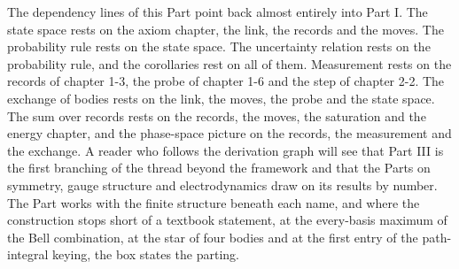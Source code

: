The dependency lines of this Part point back almost entirely into Part I. The state space rests on the axiom chapter, the link, the records and the moves. The probability rule rests on the state space. The uncertainty relation rests on the probability rule, and the corollaries rest on all of them. Measurement rests on the records of chapter 1-3, the probe of chapter 1-6 and the step of chapter 2-2. The exchange of bodies rests on the link, the moves, the probe and the state space. The sum over records rests on the records, the moves, the saturation and the energy chapter, and the phase-space picture on the records, the measurement and the exchange. A reader who follows the derivation graph will see that Part III is the first branching of the thread beyond the framework and that the Parts on symmetry, gauge structure and electrodynamics draw on its results by number. The Part works with the finite structure beneath each name, and where the construction stops short of a textbook statement, at the every-basis maximum of the Bell combination, at the star of four bodies and at the first entry of the path-integral keying, the box states the parting.
